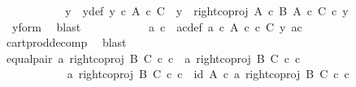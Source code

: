 \begin{isabellebody}
\ \ \ \ \ \ \ \ \isamarkupfalse%
\ \isamarkupfalse%
\ y{\isacharprime}{\kern0pt}\ \ y{\isacharprime}{\kern0pt}{\isacharunderscore}{\kern0pt}def{\isacharcolon}{\kern0pt}\ {\isachardoublequoteopen}y{\isacharprime}{\kern0pt}\ {\isasymin}\isactrlsub c\ {\isacharparenleft}{\kern0pt}A\ {\isasymtimes}\isactrlsub c\ C{\isacharparenright}{\kern0pt}\ {\isasymand}\ y\ {\isacharequal}{\kern0pt}\ right{\isacharunderscore}{\kern0pt}coproj\ {\isacharparenleft}{\kern0pt}A\ {\isasymtimes}\isactrlsub c\ B{\isacharparenright}{\kern0pt}\ {\isacharparenleft}{\kern0pt}A\ {\isasymtimes}\isactrlsub c\ C{\isacharparenright}{\kern0pt}\ {\isasymcirc}\isactrlsub c\ y{\isacharprime}{\kern0pt}{\isachardoublequoteclose}\isanewline
\ \ \ \ \ \ \ \ \ \ \isamarkupfalse%
\ \ y{\isacharunderscore}{\kern0pt}form\ \isamarkupfalse%
\ blast\isanewline
\ \ \ \ \ \ \ \ \isamarkupfalse%
\ \isamarkupfalse%
\ a{\isacharprime}{\kern0pt}\ c{\isacharprime}{\kern0pt}\ \ a{\isacharprime}{\kern0pt}c{\isacharprime}{\kern0pt}{\isacharunderscore}{\kern0pt}def{\isacharcolon}{\kern0pt}\ {\isachardoublequoteopen}a{\isacharprime}{\kern0pt}\ {\isasymin}\isactrlsub c\ A{\isachardoublequoteclose}\ {\isachardoublequoteopen}c{\isacharprime}{\kern0pt}\ {\isasymin}\isactrlsub c\ C{\isachardoublequoteclose}\ {\isachardoublequoteopen}y{\isacharprime}{\kern0pt}\ {\isacharequal}{\kern0pt}{\isasymlangle}a{\isacharprime}{\kern0pt}{\isacharcomma}{\kern0pt}c{\isacharprime}{\kern0pt}{\isasymrangle}{\isachardoublequoteclose}\isanewline
\ \ \ \ \ \ \ \ \ \ \isamarkupfalse%
\ cart{\isacharunderscore}{\kern0pt}prod{\isacharunderscore}{\kern0pt}decomp\ \isamarkupfalse%
\ blast\isanewline
\ \ \ \ \ \ \ \ \isamarkupfalse%
\ equal{\isacharunderscore}{\kern0pt}pair{\isacharcolon}{\kern0pt}\ {\isachardoublequoteopen}{\isasymlangle}a{\isacharcomma}{\kern0pt}\ right{\isacharunderscore}{\kern0pt}coproj\ B\ C\ {\isasymcirc}\isactrlsub c\ c{\isasymrangle}\ {\isacharequal}{\kern0pt}\ {\isasymlangle}a{\isacharprime}{\kern0pt}{\isacharcomma}{\kern0pt}\ right{\isacharunderscore}{\kern0pt}coproj\ B\ C\ {\isasymcirc}\isactrlsub c\ c{\isacharprime}{\kern0pt}{\isasymrangle}{\isachardoublequoteclose}\isanewline
\ \ \ \ \ \ \ \ \isamarkupfalse%
\ {\isacharminus}{\kern0pt}\ \isanewline
\ \ \ \ \ \ \ \ \ \ \isamarkupfalse%
\ {\isachardoublequoteopen}{\isasymlangle}a{\isacharcomma}{\kern0pt}\ right{\isacharunderscore}{\kern0pt}coproj\ B\ C\ {\isasymcirc}\isactrlsub c\ c{\isasymrangle}\ {\isacharequal}{\kern0pt}\ {\isasymlangle}id\ A\ {\isasymcirc}\isactrlsub c\ a{\isacharcomma}{\kern0pt}\ right{\isacharunderscore}{\kern0pt}coproj\ B\ C\ {\isasymcirc}\isactrlsub c\ c{\isasymrangle}{\isachardoublequoteclose}\isanewline

\end{isabellebody}
